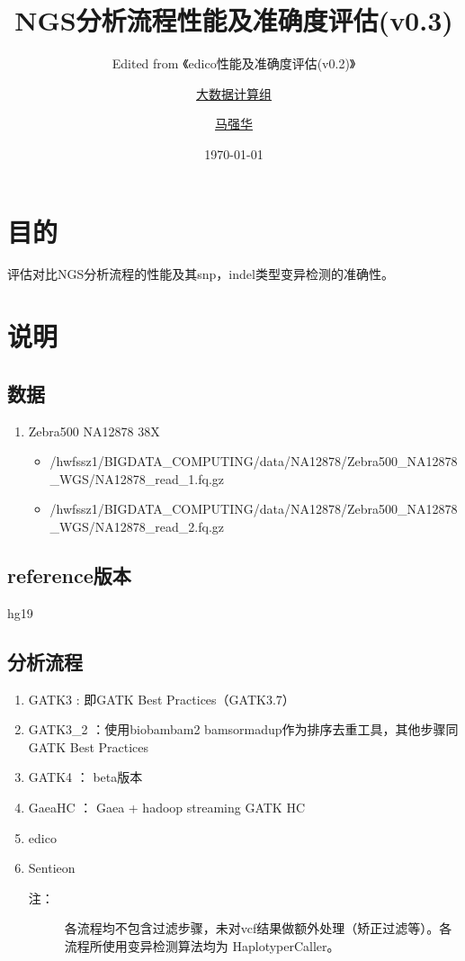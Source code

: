\documentclass[UTF8,10pt,a4paper]{ctexart}
\title{NGS分析流程性能及准确度评估{\small (v0.3)}}
\subtitle{Edited from 《edico性能及准确度评估{\small (v0.2)}》}
\author{\href{http://bigdata.genomics.cn/}{大数据计算组} \and
\href{mailto:huangzhibo@genomics.cn}{马强华}}
\date{\today}
\begin{document}
\maketitle
\vspace{3em}
\tableofcontents\thispagestyle{empty}
\newpage
\setlength{\parskip}{1ex plus 0.5ex minus 0.2ex}



\section{目的}
评估对比NGS分析流程的性能及其snp，indel类型变异检测的准确性。

\section{说明}

\subsection{数据}
\begin{enumerate}
\item Zebra500 NA12878 38X
{\footnotesize
\begin{itemize}
\item /hwfssz1/BIGDATA\_COMPUTING/data/NA12878/Zebra500\_NA12878\_WGS/NA12878\_read\_1.fq.gz
\item /hwfssz1/BIGDATA\_COMPUTING/data/NA12878/Zebra500\_NA12878\_WGS/NA12878\_read\_2.fq.gz
\end{itemize}
}
\end{enumerate}

\subsection{reference版本}
hg19

\subsection{分析流程}
\begin{enumerate}

\item GATK3 : 即GATK Best Practices（GATK3.7）
\item GATK3\_2 ：使用biobambam2 bamsormadup作为排序去重工具，其他步骤同GATK Best Practices
\item GATK4  ： beta版本
\item GaeaHC ： Gaea + hadoop streaming GATK HC
\item edico
\item Sentieon
\begin{description}
\item[注：]  各流程均不包含过滤步骤，未对vcf结果做额外处理（矫正过滤等）。各流程所使用变异检测算法均为 HaplotyperCaller。
\end{description}
\end{enumerate}
\end{document}
